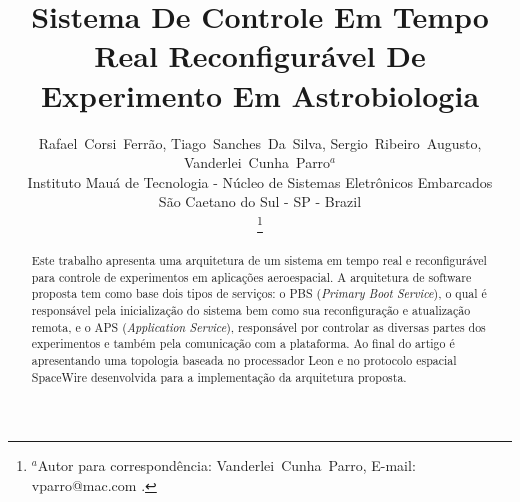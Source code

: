 \documentclass[journal,a4paper,oneside,twocolumn]{IEEEtran}
\begin{document}
%
\title{ Sistema De Controle Em Tempo Real Reconfigur\'{a}vel De 
		Experimento Em Astrobiologia }

\author{
		Rafael~Corsi~Ferr\~{a}o, 
        Tiago~Sanches~Da~Silva,
        Sergio~Ribeiro~Augusto,
        Vanderlei~Cunha~Parro$^{a}$ 
        \\%
        Instituto Mau\'{a} de Tecnologia -  N\'{u}cleo de Sistemas Eletr\^{o}nicos Embarcados \\
        S\~{a}o Caetano do Sul - SP - Brazil 
        
\thanks{ $^{a}$Autor para correspondência: Vanderlei~Cunha~Parro, E-mail: vparro@mac.com .}%
}




\maketitle


\begin{abstract}
	Este trabalho apresenta uma arquitetura de um sistema em tempo real e reconfigurável para controle de experimentos em aplicações aeroespacial. A arquitetura de software proposta tem como base dois tipos de serviços: o PBS (\textit{Primary Boot Service}), o qual é responsável pela inicialização do sistema bem como sua reconfiguração e atualização remota, e o APS (\textit{Application Service}), responsável por controlar as diversas partes dos  experimentos e também pela comunicação com a plataforma. Ao  final do artigo é apresentando uma topologia baseada no processador Leon e no protocolo espacial SpaceWire desenvolvida para a implementação da arquitetura proposta.
	
\end{abstract}
\end{document}

